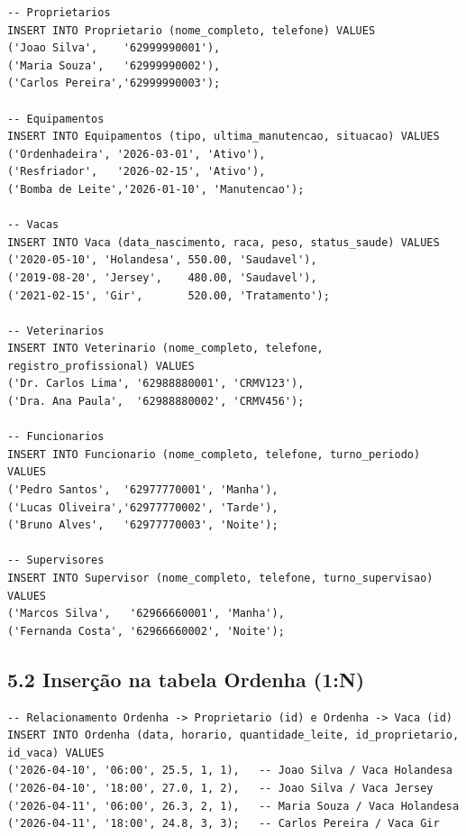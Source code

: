 \documentclass[12pt]{article}
\begin{document}
\begin{lstlisting}[caption={INSERT nas entidades independentes}]
-- Proprietarios
INSERT INTO Proprietario (nome_completo, telefone) VALUES
('Joao Silva',    '62999990001'),
('Maria Souza',   '62999990002'),
('Carlos Pereira','62999990003');

-- Equipamentos
INSERT INTO Equipamentos (tipo, ultima_manutencao, situacao) VALUES
('Ordenhadeira', '2026-03-01', 'Ativo'),
('Resfriador',   '2026-02-15', 'Ativo'),
('Bomba de Leite','2026-01-10', 'Manutencao');

-- Vacas
INSERT INTO Vaca (data_nascimento, raca, peso, status_saude) VALUES
('2020-05-10', 'Holandesa', 550.00, 'Saudavel'),
('2019-08-20', 'Jersey',    480.00, 'Saudavel'),
('2021-02-15', 'Gir',       520.00, 'Tratamento');

-- Veterinarios
INSERT INTO Veterinario (nome_completo, telefone, registro_profissional) VALUES
('Dr. Carlos Lima', '62988880001', 'CRMV123'),
('Dra. Ana Paula',  '62988880002', 'CRMV456');

-- Funcionarios
INSERT INTO Funcionario (nome_completo, telefone, turno_periodo) VALUES
('Pedro Santos',  '62977770001', 'Manha'),
('Lucas Oliveira','62977770002', 'Tarde'),
('Bruno Alves',   '62977770003', 'Noite');

-- Supervisores
INSERT INTO Supervisor (nome_completo, telefone, turno_supervisao) VALUES
('Marcos Silva',   '62966660001', 'Manha'),
('Fernanda Costa', '62966660002', 'Noite');
\end{lstlisting}

\vspace{0.3cm}
\subsection*{5.2 \enspace Inserção na tabela Ordenha (1:N)}

\begin{lstlisting}[caption={INSERT na tabela fato Ordenha}]
-- Relacionamento Ordenha -> Proprietario (id) e Ordenha -> Vaca (id)
INSERT INTO Ordenha (data, horario, quantidade_leite, id_proprietario, id_vaca) VALUES
('2026-04-10', '06:00', 25.5, 1, 1),   -- Joao Silva / Vaca Holandesa
('2026-04-10', '18:00', 27.0, 1, 2),   -- Joao Silva / Vaca Jersey
('2026-04-11', '06:00', 26.3, 2, 1),   -- Maria Souza / Vaca Holandesa
('2026-04-11', '18:00', 24.8, 3, 3);   -- Carlos Pereira / Vaca Gir
\end{lstlisting}

\vspace{0.3cm}
\end{document}

